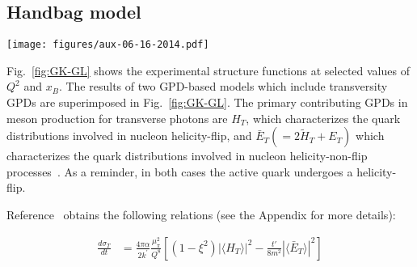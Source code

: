 \documentclass[prc,floatfix,twocolumn,superscriptaddress,letter]{revtex4}
\newcommand{\GPDHT}{\langle H_T \rangle}
\newcommand{\GPDETbar}{\langle \bar{E}_T \rangle}
\begin{document}
\subsection{Handbag model}
\begin{figure*}
\begin{center}
\texttt{[image: figures/aux-06-16-2014.pdf]}
\end{center}
\caption{ \label{fig:GK-GL} (Color online) 
The extracted structure functions vs. $t$ for the  bins  with the best kinematic coverage and  for which there are theoretical calculations. The data and curves are as follows:  black (filled circles)  - $d\sigma_U/dt =d\sigma_T/dt +\epsilon d\sigma_L/dt$,\  blue (triangles) - $d\sigma_{TT}/dt$ ,  and  red (squares) - $d\sigma_{LT}/dt$. All the structure functions are numerically given in Appendix~\ref{strfun_table}. 
The error bars are statistical only. The point-by-point propagated systematic uncertainties for all the structure functions are given in  Appendix~\ref{strfun_table}. The curves are theoretical predictions produced  with the models of Refs.~\cite{GK-ps-11} (solid) and ~\cite{Goldstein:2010gu} (dashed). In particular: black (positive) - $d\sigma_U/dt (=d\sigma_T/dt +\epsilon d\sigma_L/dt)$,\  blue (negative) - $d\sigma_{TT}/dt$,  and  red (small) - $d\sigma_{LT}/dt$
}
\end{figure*} 

Fig.~\ref{fig:GK-GL} shows the experimental structure functions at selected values of $Q^2$ and $x_B$.
The results of two GPD-based models which include transversity GPDs \cite{GK-ps-11,Goldstein:2010gu}  are  superimposed in Fig.~\ref{fig:GK-GL}. 
The primary contributing GPDs in meson production for transverse photons are  $H_T$, which characterizes the quark distributions involved in nucleon helicity-flip, and   $\bar E_T (= 2\widetilde H_T + E_T) $ which characterizes the quark distributions  involved in  nucleon  helicity-non-flip processes~\cite{diehl_haegler, Goekeler}. As a reminder, in both cases the active quark undergoes a helicity-flip. 


Reference~\cite{GK-ps-11} obtains the following relations (see the Appendix for more details):
\noindent 


\begin{align}\label{sigmat}
\frac{d\sigma_{T}}{dt} &= \frac{4\pi\alpha}{2k^\prime}\frac{\mu_\pi^2}{Q^8} \left[ \left(1-\xi^2\right) \left|\GPDHT\right|^2 - \frac{t'}{8m^2} \left|\GPDETbar\right|^2\right]
\end{align}
\end{document}

